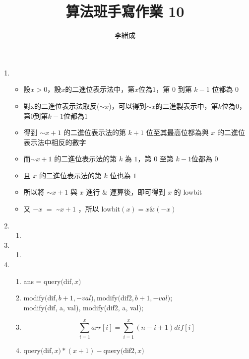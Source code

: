 \documentclass[a4paper, 12pt]{report}
\title{算法班手寫作業 10}
\author{李緒成}
\begin{document}
    \maketitle
    \makeatother
    \newpage
    \begin{enumerate}
        \item
            \begin{itemize}
                \item[] 設$x>0$，設$x$的二進位表示法中，第$x$位為$1$，第 $0$ 到第 $k-1$ 位都為 $0$ 
                \item[] 對x的二進位表示法取反($\sim x$)，可以得到$\sim x$的二進製表示中，第$k$位為$0$，第$0$到第$k-1$位都為$1$
                \item[] 得到 $\sim x+1$ 的二進位表示法的第 $k+1$ 位至其最高位都為與 $x$ 的二進位表示法中相反的數字
                \item[] 而$\sim x+1$ 的二進位表示法的第 $k$ 為 $1$，第 $0$ 至第 $k-1$位都為 $0$
                \item[] 且 $x$ 的二進位表示法的第 $k$ 位也為 $1$
                \item[] 所以將 $\sim x+1$ 與 $x$ 進行 $\& $ 運算後，即可得到 $x$ 的 lowbit 
                \item[] 又 $-x$ $=$ \~$x+1$ ，所以 lowbit$(x)= x \& (−x)$
            \end{itemize}
        \item
            \begin{enumerate}
                \item 
            \end{enumerate}
        \item 
            \begin{enumerate}
                \item 
            \end{enumerate}
        \item 
            \begin{enumerate}
                \item ans = query$($dif$, x)$
                \item modify$($dif$, b+1, -val), $modify$($dif2$, b+1, -val)$;\\
                        modify(dif, a, val), modify(dif2, a, val);
                \item \[ \sum_{i=1}^{x} arr[i] = \sum_{i=1}^{x} (n-i+1)dif[i] \]
                \item query$($dif$, x)*(x+1) - $query$($dif2$, x)$
            \end{enumerate}
    \end{enumerate}
\end{document}
